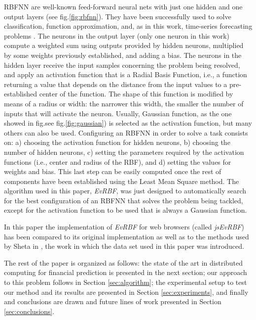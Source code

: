 \documentclass{article}
\begin{document}
RBFNN are well-known feed-forward neural nets with just one hidden and
one output layers (see fig.\ref{fig:rbfnn}). %
They have been successfully used to solve classification, function
approximation, and, as in this work, time-series forecasting problems
\cite{Broomhead88,Keogh03,Whitehead}.
The neurons in the output layer (only one neuron in this work) compute a weighted sum using outputs provided by hidden neurons, multiplied by some weights previously established, and adding a bias. The neurons in the hidden layer receive the input samples concerning the problem being resolved, and apply an activation function that  is a Radial Basis Function, i.e., a function returning a value that depends on the distance from the input values to a pre-established center of the function. The shape of this function is modified by means of a radius or width: the narrower this width, the smaller the number of inputs that will activate the neuron. Usually, Gaussian function, as the one showed in fig.see fig.\ref{fig:gaussian}) is selected as the activation function, but many others can also be used.
Configuring an RBFNN in order to solve a task consists on: a) choosing
the activation function for hidden neurons, b) choosing the number of
hidden neurons, c) setting the parameters required by the activation
functions (i.e., center and radius of the RBF), and d) setting the
values for weights and bias. This last step can be easily computed
once the rest of components have been established using the Least Mean
Square method. The algorithm used in this paper, {\em EvRBF},  was just designed to automatically
search for the best configuration of an RBFNN that solves the problem
being tackled, except for the activation function to be used that is
always a Gaussian function.



In this paper the implementation of {\em EvRBF} for web browsers
(called {\em jsEvRBF}) has been compared to its original
implementation as well as to the methods used by Sheta in
\cite{Sheta2001}, the work in which the data set used in this paper
was introduced.

The rest of the paper is organized as follows: the state of the art in
distributed computing for financial prediction is presented in the
next section; our approach to this problem follows in Section
\ref{sec:algorithm}; the experimental setup to test our method and its
results are presented in Section \ref{sec:experiments}, and finally
and conclusions are drawn and future
lines of work presented in Section \ref{sec:conclusions}.
\end{document}
